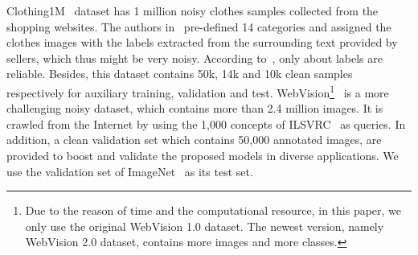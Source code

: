 \documentclass[journal]{IEEEtran}
\begin{document}
Clothing1M~\cite{xiao2015learning} dataset has 1 million noisy clothes samples collected from the shopping websites. The authors in~\cite{xiao2015learning} pre-defined 14 categories and assigned the clothes images with the labels extracted from the surrounding text provided by sellers, which thus might be very noisy. According to~\cite{xiao2015learning}, only about  labels are reliable. Besides, this dataset contains 50k, 14k and 10k clean samples respectively for auxiliary training, validation and test. WebVision\footnote{Due to the reason of time and the computational resource, in this paper, we only use the original WebVision 1.0 dataset. The newest version, namely WebVision 2.0 dataset, contains more images and more classes.}~\cite{li2017webvision} is a more challenging noisy dataset, which contains more than 2.4 million images. It is crawled from the Internet by using the 1,000 concepts of ILSVRC~\cite{imagenet_cvpr09} as queries. In addition, a clean validation set which contains 50,000 annotated images, are provided to boost and validate the proposed models in diverse applications. We use the validation set of ImageNet~\cite{imagenet_cvpr09} as its test set.

\begin{table*} [t]
\centering
\caption{The average accuracy () over 5 trials on CIFAR-10 and CIFAR-100 with different noise levels.} 
{
}
\label{tab:cifar}
\end{table*}
 
\end{document}
